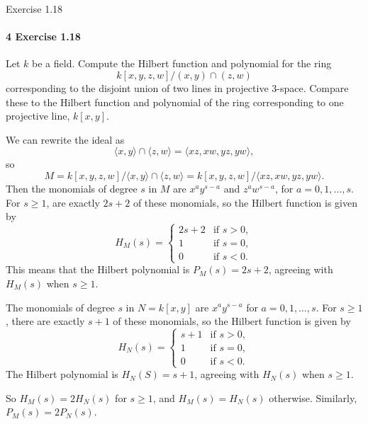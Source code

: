 \documentclass[12pt]{article}
\newlength{\myparskip}
\newenvironment{fullbox}{\begin{lrbox}{\savefullbox}\begin{minipage}{\dimexpr\textwidth-2\fboxsep\relax}\setlength{\parskip}{\myparskip}}{\end{minipage}\end{lrbox}\framebox[\textwidth]{\usebox{\savefullbox}}}
\newenvironment{pbox}[1][]{\begin{fullbox}\ifx#1\empty\else\paragraph{#1}\fi}{\end{fullbox}}
\newcommand{\<}{\langle}
\renewcommand{\>}{\rangle}
\begin{document}
\newpage
\begin{pbox}[4 Exercise 1.18]
    Let $k$ be a field. Compute the Hilbert function and polynomial for the ring
    \[
        k[x, y, z, w]/(x, y) \cap (z, w)
    \]
    corresponding to the disjoint union of two lines in projective $3$-space. Compare these to the Hilbert function and polynomial of the ring corresponding to one projective line, $k[x, y]$.
\end{pbox}

We can rewrite the ideal as
\[
    \<x, y\> \cap \<z, w\> = \<xz, xw, yz, yw\>,
\]
so
\[
    M = k[x, y, z, w]/\<x, y\> \cap \<z, w\> = k[x, y, z, w]/\<xz, xw, yz, yw\>.
\]
Then the monomials of degree $s$ in $M$ are $x^ay^{s-a}$ and $z^aw^{s-a}$, for $a = 0, 1, \dots, s$. For $s \geq 1$, are exactly $2s + 2$ of these monomials, so the Hilbert function is given by
\[
    H_M(s) = \begin{cases}
        2s + 2 &\text{if } s > 0, \\
        1 &\text{if } s = 0, \\
        0 &\text{if } s < 0.
    \end{cases}
\]
This means that the Hilbert polynomial is $P_M(s) = 2s + 2$, agreeing with $H_M(s)$ when $s \geq 1$.

The monomials of degree $s$ in $N = k[x, y]$ are $x^ay^{s-a}$ for $a = 0, 1, \dots, s$. For $s \geq 1$, there are exactly $s + 1$ of these monomials, so the Hilbert function is given by
\[
    H_N(s) = \begin{cases}
        s + 1 &\text{if } s > 0, \\
        1 &\text{if } s = 0, \\
        0 &\text{if } s < 0.
    \end{cases}
\]
The Hilbert polynomial is $H_N(S) = s + 1$, agreeing with $H_N(s)$ when $s \geq 1$.

So $H_M(s) = 2H_N(s)$ for $s \geq 1$, and $H_M(s) = H_N(s)$ otherwise. Similarly, $P_M(s) = 2P_N(s)$.
\end{document}
